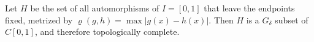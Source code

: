 Let $H$ be the set of all automorphisms of $I = [0,1]$ that leave the endpoints fixed, metrized by $\varrho(g, h) = \max|g(x) - h(x)|$. Then $H$ is a $G_\delta$ subset of $C[0,1]$, and therefore topologically complete.
